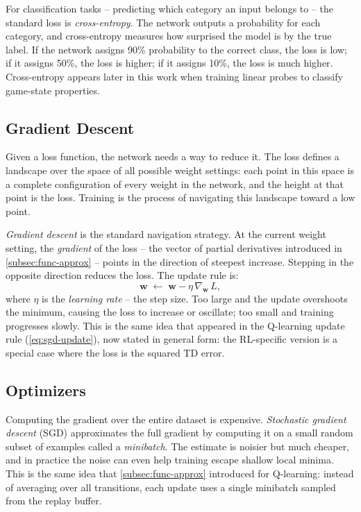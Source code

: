 \smallskip
For classification tasks -- predicting which category an input
belongs to -- the standard loss is \emph{cross-entropy}. The
network outputs a probability for each category, and cross-entropy
measures how surprised the model is by the true label. If the
network assigns 90\% probability to the correct class, the loss is
low; if it assigns 50\%, the loss is higher; if it assigns 10\%,
the loss is much higher. Cross-entropy appears later in this work
when training linear probes to classify game-state properties.

\subsection{Gradient Descent}
\label{subsec:gradient-descent}

Given a loss function, the network needs a way to reduce it. The
loss defines a landscape over the space of all possible weight
settings: each point in this space is a complete configuration of
every weight in the network, and the height at that point is the
loss. Training is the process of navigating this landscape toward
a low point.

\smallskip
\emph{Gradient descent} is the standard navigation strategy. At the
current weight setting, the \emph{gradient} of the loss -- the
vector of partial derivatives introduced in \cref{subsec:func-approx}
-- points in the direction of steepest increase. Stepping in the
opposite direction reduces the loss. The update rule is:
%
\begin{equation}
\label{eq:generic-gd}
\mathbf{w} \;\leftarrow\; \mathbf{w} - \eta\, \nabla_{\mathbf{w}}\, L,
\end{equation}
%
where $\eta$ is the \emph{learning rate} -- the step size. Too large
and the update overshoots the minimum, causing the loss to increase
or oscillate; too small and training progresses slowly. This is the
same idea that appeared in the Q-learning update rule
(\cref{eq:sgd-update}), now stated in general form: the RL-specific
version is a special case where the loss is the squared TD error.

\subsection{Optimizers}
\label{subsec:optimizers}

Computing the gradient over the entire dataset is expensive.
\emph{Stochastic gradient descent} (SGD) approximates the full
gradient by computing it on a small random subset of examples
called a \emph{minibatch}. The estimate is noisier but much
cheaper, and in practice the noise can even help training escape
shallow local minima. This is the same idea that
\cref{subsec:func-approx} introduced for Q-learning: instead of
averaging over all transitions, each update uses a single
minibatch sampled from the replay buffer.

